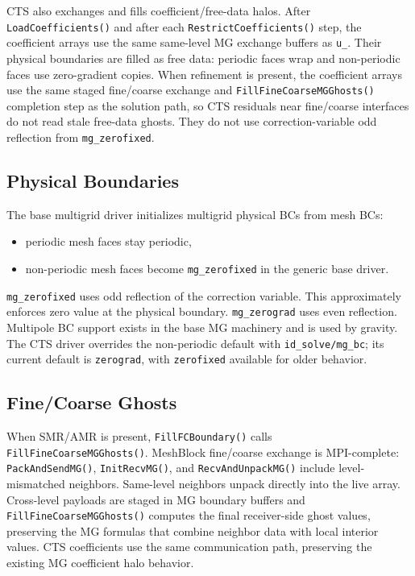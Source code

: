 \documentclass[11pt]{article}
\newcommand{\code}[1]{\texttt{#1}}
\begin{document}
CTS also exchanges and fills coefficient/free-data halos.  After
\code{LoadCoefficients()} and after each \code{RestrictCoefficients()} step, the
coefficient arrays use the same same-level MG exchange buffers as \code{u\_}.
Their physical boundaries are filled as free data: periodic faces wrap and
non-periodic faces use zero-gradient copies.  When refinement is present, the
coefficient arrays use the same staged fine/coarse exchange and
\code{FillFineCoarseMGGhosts()} completion step as the solution path, so CTS
residuals near fine/coarse interfaces do not read stale free-data ghosts.  They
do not use correction-variable odd reflection from \code{mg\_zerofixed}.

\subsection{Physical Boundaries}

The base multigrid driver initializes multigrid physical BCs from mesh BCs:
\begin{itemize}
  \item periodic mesh faces stay periodic,
  \item non-periodic mesh faces become \code{mg\_zerofixed} in the generic base
        driver.
\end{itemize}

\code{mg\_zerofixed} uses odd reflection of the correction variable.  This
approximately enforces zero value at the physical boundary.  \code{mg\_zerograd}
uses even reflection.  Multipole BC support exists in the base MG machinery and
is used by gravity.  The CTS driver overrides the non-periodic default with
\code{id\_solve/mg\_bc}; its current default is \code{zerograd}, with
\code{zerofixed} available for older behavior.

\subsection{Fine/Coarse Ghosts}

When SMR/AMR is present, \code{FillFCBoundary()} calls
\code{FillFineCoarseMGGhosts()}.  MeshBlock fine/coarse exchange is
MPI-complete: \code{PackAndSendMG()}, \code{InitRecvMG()}, and
\code{RecvAndUnpackMG()} include level-mismatched neighbors.  Same-level
neighbors unpack directly into the live array.  Cross-level payloads are staged
in MG boundary buffers and \code{FillFineCoarseMGGhosts()} computes the final
receiver-side ghost values, preserving the MG formulas that combine neighbor
data with local interior values.  CTS coefficients use the same communication
path, preserving the existing MG coefficient halo behavior.
\end{document}

